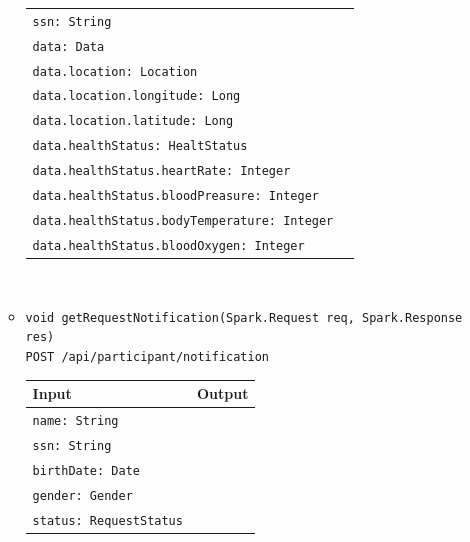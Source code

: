 \documentclass[a4paper, hidelinks, 12pt]{report}
\begin{document}
\begin{itemize}
\begin{itemize}
\begin{tabular}{l | l}
			\hline
				\verb|ssn: String| & \\
				\verb|data: Data| & \\
				\verb|data.location: Location| & \\
				\verb|data.location.longitude: Long| & \\
				\verb|data.location.latitude: Long| & \\
				\verb|data.healthStatus: HealtStatus| & \\
				\verb|data.healthStatus.heartRate: Integer| & \\
				\verb|data.healthStatus.bloodPreasure: Integer| & \\
				\verb|data.healthStatus.bodyTemperature: Integer| & \\
				\verb|data.healthStatus.bloodOxygen: Integer| & \\
			\end{tabular}\\
			\item{\verb|void getRequestNotification(Spark.Request req, Spark.Response res)|\\ \verb|POST /api/participant/notification|}\\
			\begin{tabular}{l | l}
			\textbf{Input} & \textbf{Output} \\
			\hline
				\verb|name: String| & \\
				\verb|ssn: String| & \\
				\verb|birthDate: Date| & \\
				\verb|gender: Gender| & \\
				\verb|status: RequestStatus| & \\
			\end{tabular}\\
		\end{itemize}
	\end{itemize}
	
\end{document}
